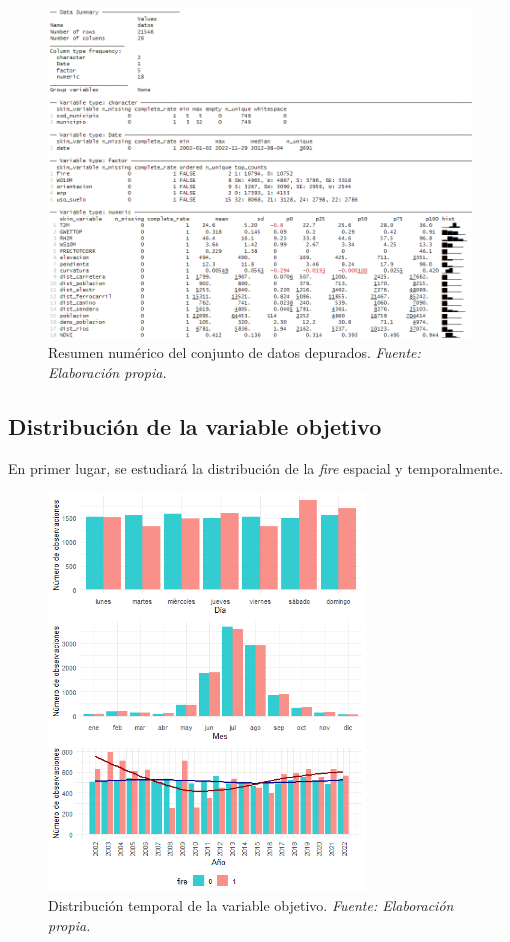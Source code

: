 \documentclass[12pt,a4paper,]{book}
\numberwithin{dummy}{section}
\theoremstyle{ocrenumbox}
\theoremstyle{blacknumex}
\theoremstyle{blacknumbox}
\theoremstyle{ocrenum}
\theoremstyle{ocrenum}
\begin{document}
\begin{figure}[htb]
\centering
\includegraphics[width = \textwidth]{graficos/skim_datos.png}
\caption{Resumen numérico del conjunto de datos depurados. \it Fuente: Elaboración propia.}
\label{fig:skim_datos}
\end{figure}

\hypertarget{distribuciuxf3n-de-la-variable-objetivo}{%
\subsection{Distribución de la variable
objetivo}\label{distribuciuxf3n-de-la-variable-objetivo}}

En primer lugar, se estudiará la distribución de la \emph{fire} espacial
y temporalmente.

\begin{figure}[htb]
\centering
\includegraphics[width = 0.75\textwidth]{graficos/distribucion_temporal_fire.png}
\caption{Distribución temporal de la variable objetivo. \it Fuente: Elaboración propia.}
\label{fig:dist_temp_fire}
\end{figure}
\end{document}
